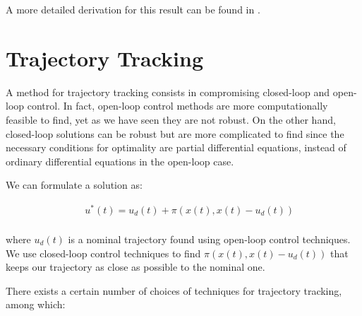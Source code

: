 ﻿\documentclass[twoside]{article}
\begin{document}
A more detailed derivation for this result can be found in \cite{lyupanov}.


\section{Trajectory Tracking}
A method for trajectory tracking consists in compromising closed-loop and open-loop control. In fact, open-loop control methods are more computationally feasible to find, yet as we have seen they are not robust. On the other hand, closed-loop solutions can be robust but are more complicated to find since the necessary conditions for optimality are partial differential equations, instead of ordinary differential equations in the open-loop case.

We can formulate a solution as:

\begin{equation} \label{constrained}
\begin{split}
\: \: &u^*(t) = u_d(t) + \pi(x(t), x(t)-u_d(t)) \\
\end{split}
\end{equation}

where $u_d(t)$ is a nominal trajectory found using open-loop control techniques. We use closed-loop control techniques to find $\pi(x(t), x(t)-u_d(t))$ that keeps our trajectory as close as possible to the nominal one.

There exists a certain number of choices of techniques for trajectory tracking, among which:
\end{document}
